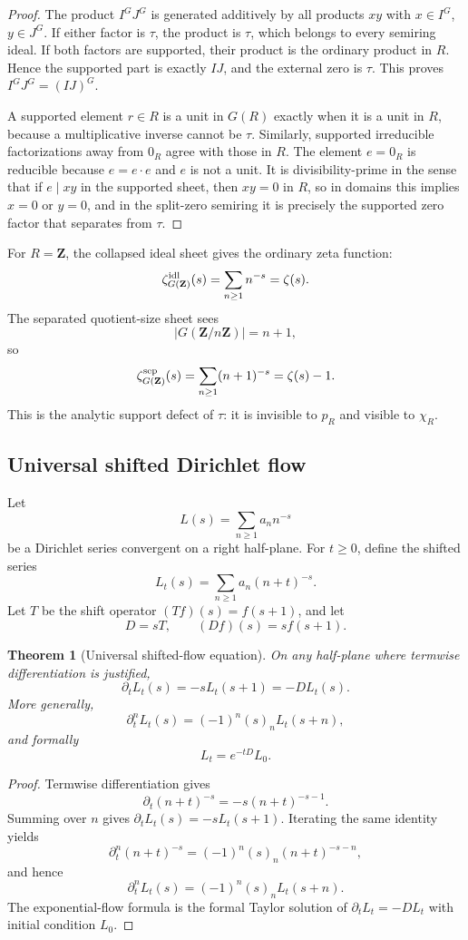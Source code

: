 \documentclass[11pt]{article}
\newcommand{\Z}{\mathbf Z}
\theoremstyle{plain}
\newtheorem{theorem}{Theorem}[section]
\theoremstyle{definition}
\numberwithin{equation}{section}
\begin{document}
\begin{proof}
The product \(I^GJ^G\) is generated additively by all products \(xy\) with \(x\in I^G\), \(y\in J^G\).  If either factor is \(\tau\), the product is \(\tau\), which belongs to every semiring ideal.  If both factors are supported, their product is the ordinary product in \(R\).  Hence the supported part is exactly \(IJ\), and the external zero is \(\tau\).  This proves \(I^GJ^G=(IJ)^G\).

A supported element \(r\in R\) is a unit in \(G(R)\) exactly when it is a unit in \(R\), because a multiplicative inverse cannot be \(\tau\).  Similarly, supported irreducible factorizations away from \(0_R\) agree with those in \(R\).  The element \(e=0_R\) is reducible because \(e=e\cdot e\) and \(e\) is not a unit.  It is divisibility-prime in the sense that if \(e\mid xy\) in the supported sheet, then \(xy=0\) in \(R\), so in domains this implies \(x=0\) or \(y=0\), and in the split-zero semiring it is precisely the supported zero factor that separates from \(\tau\).
\end{proof}

For \(R=\Z\), the collapsed ideal sheet gives the ordinary zeta function:
\[
 \zeta_{G(\Z)}^{\rm idl}(s)=\sum_{n\ge1}n^{-s}=\zeta(s).
\]
The separated quotient-size sheet sees
\[
 |G(\Z/n\Z)|=n+1,
\]
so
\[
 \zeta_{G(\Z)}^{\rm sep}(s)=\sum_{n\ge1}(n+1)^{-s}=\zeta(s)-1.
\]
This is the analytic support defect of \(\tau\): it is invisible to \(p_R\) and visible to \(\chi_R\).

\subsection{Universal shifted Dirichlet flow}

Let
\[
 L(s)=\sum_{n\ge1}a_n n^{-s}
\]
be a Dirichlet series convergent on a right half-plane.  For \(t\ge0\), define the shifted series
\[
 L_t(s)=\sum_{n\ge1}a_n(n+t)^{-s}.
\]
Let \(T\) be the shift operator \((Tf)(s)=f(s+1)\), and let
\[
 D=sT,
 \qquad
 (Df)(s)=s f(s+1).
\]

\begin{theorem}[Universal shifted-flow equation]\label{thm:universal-flow}
On any half-plane where termwise differentiation is justified,
\[
 \partial_tL_t(s)=-sL_t(s+1)=-DL_t(s).
\]
More generally,
\[
 \partial_t^nL_t(s)=(-1)^n(s)_nL_t(s+n),
\]
and formally
\[
 L_t=e^{-tD}L_0.
\]
\end{theorem}

\begin{proof}
Termwise differentiation gives
\[
 \partial_t(n+t)^{-s}=-s(n+t)^{-s-1}.
\]
Summing over \(n\) gives \(\partial_tL_t(s)=-sL_t(s+1)\).  Iterating the same identity yields
\[
 \partial_t^n(n+t)^{-s}=(-1)^n(s)_n(n+t)^{-s-n},
\]
and hence
\[
 \partial_t^nL_t(s)=(-1)^n(s)_nL_t(s+n).
\]
The exponential-flow formula is the formal Taylor solution of \(\partial_tL_t=-DL_t\) with initial condition \(L_0\).
\end{proof}
\end{document}
